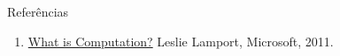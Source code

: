 \begin{frame}{Referências}
 
  \begin{enumerate}
  \item \href{http://www.youtube.com/watch?v=BDPHfRuAFnU}{What is
      Computation?} Leslie Lamport, Microsoft, 2011.
    
  \end{enumerate}
  
\end{frame}


